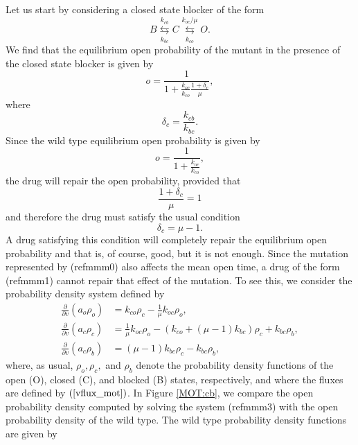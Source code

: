 Let us start by considering a closed state blocker of the form
\begin{equation}
B\underset{k_{bc}}{\overset{k_{cb}}{\leftrightarrows}}C\underset{k_{co}}{\overset{k_{oc}/\mu}{\leftrightarrows}}O. \label{mmm1}
\end{equation}
We find that the equilibrium open probability of the mutant in the presence of the
closed state blocker is given by
\[
o=\frac{1}{1+\frac{k_{oc}}{k_{co}}\frac{1+\delta_{c}}{\mu}},
\]
where
\[
\delta_{c}=\frac{k_{cb}}{k_{bc}}.
\]
Since the wild type equilibrium open probability is given by
\[
o=\frac{1}{1+\frac{k_{oc}}{k_{co}}},
\]
the drug will repair the open probability, provided that
\[
\frac{1+\delta_{c}}{\mu}=1
\]
and therefore the drug must satisfy the usual condition
\[
\delta_{c}=\mu-1.
\]
A drug satisfying this condition will completely repair the equilibrium open
probability and that is, of course, good, but it is not enough. Since the
mutation represented by (ref{mmm0}) also affects the mean
open time, a drug of the form (ref{mmm1}) cannot repair that
effect of the mutation. To see this, we consider the probability
density system defined by
\begin{align}
\frac{\partial}{\partial v}\left(  a_{o}\rho_{o}\right)   &  =k_{co}\rho
_{c}-\frac{1}{\mu}k_{oc}\rho_{o},\nonumber\\
\frac{\partial}{\partial v}\left(  a_{c}\rho_{c}\right)   &  =\frac{1}{\mu}k_{oc}\rho
_{o}-\left(  k_{co}+\left(  \mu-1\right)  k_{bc}\right)  \rho_{c}+k_{bc}
\rho_{b},\label{mmm3}\\
\frac{\partial}{\partial v}\left(  a_{c}\rho_{b}\right)   &  =\left(
\mu-1\right)  k_{bc}\rho_{c}-k_{bc}\rho_{b},\nonumber
\end{align}
where, as usual, $\rho_{o},\rho_{c},$ and $\rho_{b}$ denote the probability
density functions of the open (O), closed (C), and blocked (B) states,
respectively, and where the fluxes are defined by $\left(  \ref{vflux_mot}
\right)  $. In Figure \ref{MOT:cb}, we compare the open probability density computed by
solving the system (ref{mmm3}) with the open probability
density of the wild type. The wild type probability density functions are
given by


